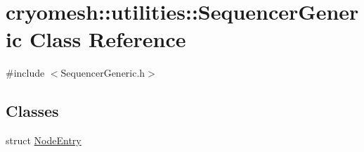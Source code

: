 \hypertarget{classcryomesh_1_1utilities_1_1SequencerGeneric}{\section{cryomesh\-:\-:utilities\-:\-:\-Sequencer\-Generic \-Class \-Reference}
\label{classcryomesh_1_1utilities_1_1SequencerGeneric}
}


{\ttfamily \#include $<$\-Sequencer\-Generic.\-h$>$}

\subsection*{\-Classes}
\begin{DoxyCompactItemize}
\item 
struct \hyperlink{structcryomesh_1_1utilities_1_1SequencerGeneric_1_1NodeEntry}{\-Node\-Entry}
\end{DoxyCompactItemize}
